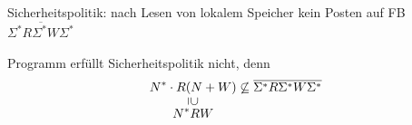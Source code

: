 Sicherheitspolitik: nach Lesen von lokalem Speicher kein Posten auf FB  $\overline{\Sigma^*R\Sigma^*W\Sigma^*}$

Programm erfüllt Sicherheitspolitik nicht, denn
\[
	\underset{\underset{\displaystyle N^*RW}{\rotatebox[origin=c]{-90}{$\supseteq$}}}{N^*\cdot R(N+W)} \not\subseteq \overline{\Sigma^*R\Sigma^*W\Sigma^*}
\]